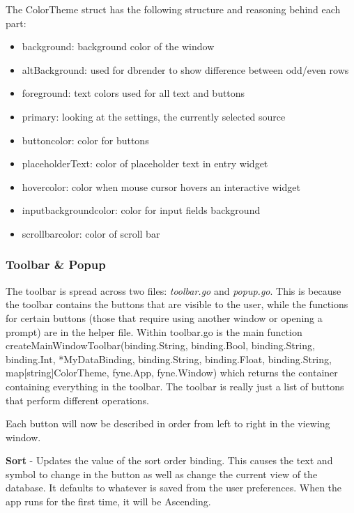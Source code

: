 The ColorTheme struct has the following structure and reasoning
behind each part:
\begin{itemize}
	\item background: background color of the window
	\item altBackground: used for dbrender to show difference between odd/even rows
	\item foreground: text colors used for all text and buttons
	\item primary: looking at the settings, the currently selected source
	\item buttoncolor: color for buttons
	\item placeholderText: color of placeholder text in entry widget
	\item hovercolor: color when mouse cursor hovers an interactive widget
	\item inputbackgroundcolor: color for input fields background
	\item scrollbarcolor: color of scroll bar
\end{itemize}

\subsubsection{Toolbar \& Popup}
\label{subsubsec:ToolPop}

The toolbar is spread across two files: \textit{toolbar.go} and
\textit{popup.go}. This is because the toolbar contains the buttons
that are visible to the user, while the functions for certain buttons
(those that require using another window or opening a prompt) are in
the helper file.
Within toolbar.go is the main function
createMainWindowToolbar(binding.String, binding.Bool, binding.String,
	binding.Int, *MyDataBinding, binding.String, binding.Float,
binding.String, map[string]ColorTheme, fyne.App, fyne.Window) which
returns the container containing everything in the toolbar.
The toolbar is really just a list of buttons that perform different operations.

Each button will now be described in order from left to right in the
viewing window.

\textbf{Sort} - Updates the value of the sort order binding. This
causes the text and symbol to change in the button as
well as change the current view of the database. It defaults to
whatever is saved from the user preferences. When the app runs for
the first time, it will be Ascending.

